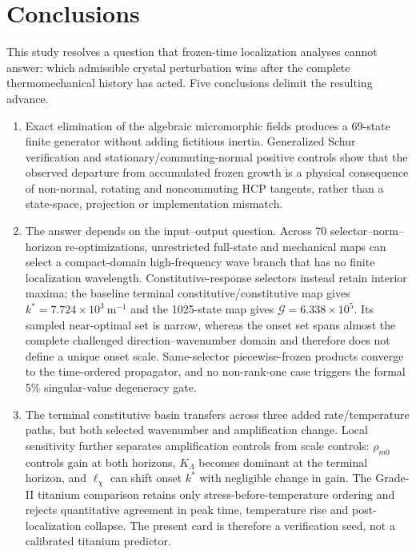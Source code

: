 \section{Conclusions}
\label{sec:conclusions_dynamic}

This study resolves a question that frozen-time localization analyses cannot
answer: which admissible crystal perturbation wins after the complete
thermomechanical history has acted. Five conclusions delimit the resulting
advance.

\begin{enumerate}
\item Exact elimination of the algebraic micromorphic fields produces a
69-state finite generator without adding fictitious inertia. Generalized
Schur verification and stationary/commuting-normal positive controls show
that the observed departure from accumulated frozen growth is a physical
consequence of non-normal, rotating and noncommuting HCP tangents, rather than
a state-space, projection or implementation mismatch.

\item The answer depends on the input--output question. Across 70
selector--norm--horizon re-optimizations, unrestricted full-state and
mechanical maps can select a compact-domain high-frequency wave branch that
has no finite localization wavelength. Constitutive-response selectors
instead retain interior maxima; the baseline terminal
constitutive/constitutive map gives
$k^*=7.724\times10^3~\mathrm{m^{-1}}$ and the 1025-state map gives
$\mathcal G=6.338\times10^5$.  Its sampled near-optimal set is narrow,
whereas the onset set spans almost the complete challenged
direction--wavenumber domain and therefore does not define a unique onset
scale. Same-selector piecewise-frozen products
converge to the time-ordered propagator, and no non-rank-one case triggers the
formal 5\% singular-value degeneracy gate.

\item The terminal constitutive basin transfers across three added
rate/temperature paths, but both selected wavenumber and amplification change.
Local sensitivity further separates amplification controls from scale
controls: $\rho_{m0}$ controls gain at both horizons, $K_\Lambda$ becomes
dominant at the terminal horizon, and $\ell_\chi$ can shift onset $k^*$ with
negligible change in gain. The
Grade-II titanium comparison retains only stress-before-temperature ordering
and rejects quantitative agreement in peak time, temperature rise and
post-localization collapse. The present card is therefore a verification
seed, not a calibrated titanium predictor.


\end{enumerate}
